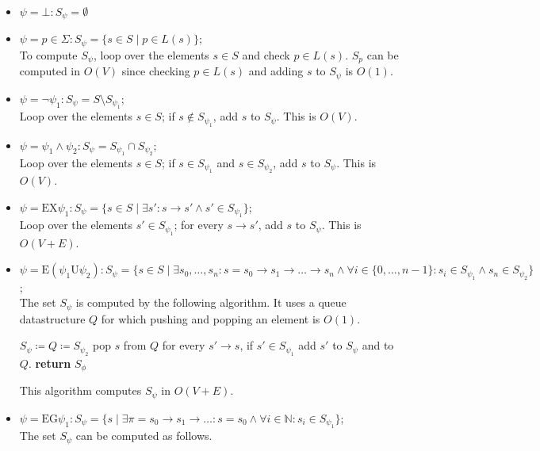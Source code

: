 \documentclass[10pt,a4paper]{article}
\theoremstyle{definition}
\begin{document}
\begin{itemize}
	\item $\psi = \bot: S_\psi = \emptyset$
	\item $\psi = p \in \Sigma: S_\psi = \{s \in S \mid p \in L(s)\}$; \\
	To compute $S_{\psi}$, loop over the elements $s \in S$ and check $p \in L(s)$. $S_p$ can be computed in $O(V)$ since checking $p \in L(s)$ and adding $s$ to $S_{\psi}$ is $O(1)$.
	\item $\psi = \lnot \psi_1: S_\psi = S \setminus S_{\psi_1}$; \\
	Loop over the elements $s\in S$; if $s\not\in S_{\psi_1}$, add $s$ to $S_\psi$. This is $O(V)$.
	\item $\psi = \psi_1\land\psi_2: S_\psi = S_{\psi_1} \cap S_{\psi_2}$; \\
	Loop over the elements $s\in S$; if $s\in S_{\psi_1}$ and $s\in S_{\psi_2}$, add $s$ to $S_\psi$. This is $O(V)$.
	\item $\psi = \text{EX}\psi_1: S_\psi = \{s \in S \mid \exists s':s\rightarrow s' \land s' \in S_{\psi_1}\}$; \\
	Loop over the elements $s'\in S_{\psi_1}$; for every $s\rightarrow s'$, add $s$ to $S_\psi$. This is $O(V+E)$.
	\item $\psi = \text{E}(\psi_1 \text{U}\psi_2): S_\psi = \{s \in S \mid \exists s_0,\dots,s_n:s = s_0 \rightarrow s_1 \rightarrow \dots \rightarrow s_n \land \forall i \in \{0,\dots,n-1\}: s_i \in S_{\psi_1} \land s_n \in S_{\psi_2}\}$; \\
	The set $S_\psi$ is computed by the following algorithm. It uses a queue datastructure $Q$ for which pushing and popping an element is $O(1)$.
	
\begin{algorithm}
\begin{algorithmic}[1]
    \State $S_\psi \coloneqq Q \coloneqq S_{\psi_2}$
    	\State pop $s$ from $Q$
    	\State for every $s'\rightarrow s$, if $s' \in S_{\psi_1}$ add $s'$ to $S_{\psi}$ and to $Q$.
    \EndWhile
    \State \textbf{return} $S_\phi$
\end{algorithmic}
\end{algorithm}

This algorithm computes $S_\psi$ in $O(V+E)$.

	\item $\psi = \text{EG}\psi_1: S_\psi = \{s \mid \exists \pi = s_0 \rightarrow s_1 \rightarrow \dots : s = s_0 \land \forall i \in \mathbb{N} : s_i \in S_{\psi_1}\}$; \\
	The set $ S_\psi$ can be computed as follows.


\end{itemize}
\end{document}
